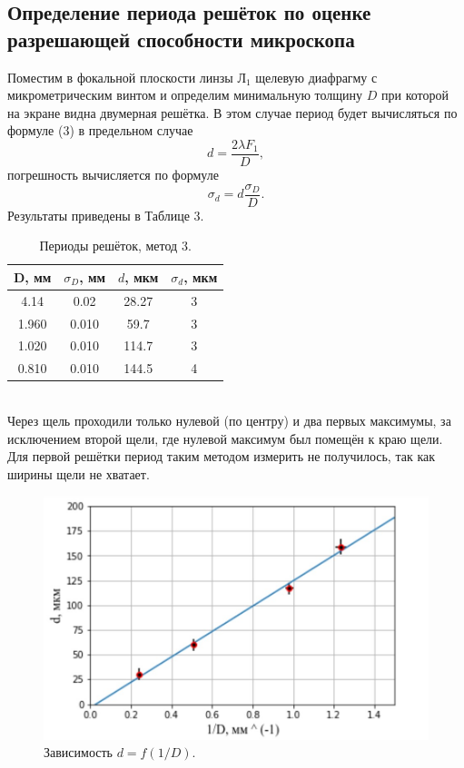 \documentclass[a4paper,12pt]{article}
\begin{document}
\subsection{Определение периода решёток по оценке разрешающей способности микроскопа}
Поместим в фокальной плоскости линзы $\text{Л}_1$ щелевую диафрагму с микрометрическим винтом и определим минимальную толщину $D$ при которой на экране видна двумерная решётка. В этом случае период будет вычисляться по формуле (3) в предельном случае
$$
d = \dfrac{2\lambda F_1}{D},
$$
погрешность вычисляется по формуле 
$$
\sigma_d = d \dfrac{\sigma_D}{D}.
$$
Результаты приведены в Таблице 3.
\begin{table}[h]
\begin{tabular}{|c|c|c|c|}
\hline
D, мм & $\sigma_D$, мм & $d$, мкм & $\sigma_d$, мкм \\ \hline
4.14  & 0.02           & 28.27    & 3            \\ \hline
1.960 & 0.010          & 59.7     & 3             \\ \hline
1.020 & 0.010          & 114.7    & 3             \\ \hline
0.810 & 0.010          & 144.5    & 4             \\ \hline
\end{tabular}
\centering
\caption{Периоды решёток, метод 3.}
\end{table}\\
Через щель проходили только нулевой (по центру) и два первых максимумы, за исключением второй щели, где нулевой максимум был помещён к краю щели. Для первой решётки период таким методом измерить не получилось, так как ширины щели не хватает.
\newpage
\begin{figure}[h]
\includegraphics[scale=0.7]{graph.jpg}
\centering
\caption{Зависимость $d = f(1/D)$.}
\end{figure}
\end{document}
